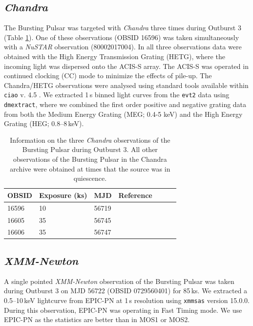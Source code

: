 \subsection{\textit{Chandra}}

\par The Bursting Pulsar was targeted with \textit{Chandra} \citep{Weisskopf_Chandra} three times during Outburst 3 (Table \ref{tab:Chandra}).  One of these observations (OBSID 16596) was taken simultaneously with a \textit{NuSTAR} observation (80002017004).  In all three observations data were obtained with the High Energy Transmission Grating (HETG), where the incoming light was dispersed onto the ACIS-S \citep{Garmire_ACIS} array. The ACIS-S was operated in continued clocking (CC) mode to minimize the effects of pile-up. The  Chandra/HETG observations were analysed using standard tools available within \texttt{ciao} v. 4.5 \citep{Fruscione_Ciao}. We extracted 1\,s binned light curves from the \texttt{evt2} data using \texttt{dmextract}, where we combined the first order positive and negative grating data from both the Medium Energy Grating (MEG; 0.4-5 keV) and the High Energy Grating (HEG; 0.8--8\,keV).

\begin{table}
\centering
\begin{tabular}{lllllll}
\hline
\hline
\scriptsize  OBSID &\scriptsize Exposure (ks) &\scriptsize MJD &\scriptsize Reference \\
\hline
16596  	& 10 &  56719      &   \citet{Younes_Expo} \\
16605  	& 35 &   56745    &    \citet{Degenaar_BPSpec}\\
16606  	& 35 &   56747    &    \citet{Degenaar_BPSpec}\\
\hline
\hline
\end{tabular}
\caption[Information on the three \textit{Chandra} observations of the Bursting Pulsar during Outburst 3.]{Information on the three \textit{Chandra} observations of the Bursting Pulsar during Outburst 3.  All other observations of the Bursting Pulsar in the Chandra archive were obtained at times that the source was in quiescence.}
\label{tab:Chandra}
\end{table}

\subsection{\textit{XMM-Newton}}

\par A single pointed \textit{XMM-Newton} observation of the Bursting Pulsar was taken during Outburst 3 on MJD 56722 (OBSID 0729560401) for 85\,ks.  We extracted a 0.5--10\,keV lightcurve from EPIC-PN at 1\,s resolution using \texttt{xmmsas} version 15.0.0.  During this observation, EPIC-PN was operating in Fast Timing mode.  We use EPIC-PN as the statistics are better than in MOS1 or MOS2.

